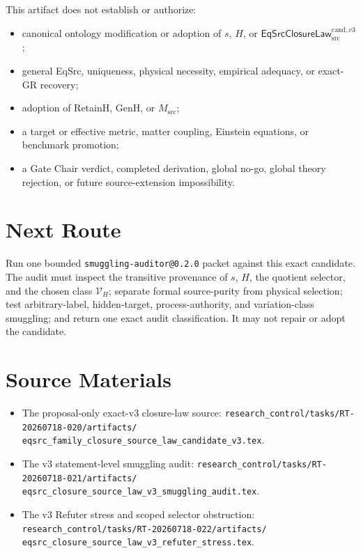 \documentclass[11pt]{article}
\newcommand{\Law}{\mathsf{EqSrcClosureLaw}^{\mathrm{cand},v3}_{\mathrm{src}}}
\newcommand{\Vary}{\mathcal V_H}
\begin{document}
This artifact does not establish or authorize:
\begin{itemize}[leftmargin=*]
  \item canonical ontology modification or adoption of \(s\), \(H\), or
  \(\Law\);
  \item general EqSrc, uniqueness, physical necessity, empirical adequacy, or
  exact-GR recovery;
  \item adoption of RetainH, GenH, or \(M_{\mathrm{src}}\);
  \item a target or effective metric, matter coupling, Einstein equations, or
  benchmark promotion;
  \item a Gate Chair verdict, completed derivation, global no-go, global
  theory rejection, or future source-extension impossibility.
\end{itemize}

\section{Next Route}

Run one bounded \texttt{smuggling-auditor@0.2.0} packet against this exact
candidate. The audit must inspect the transitive provenance of \(s\), \(H\),
the quotient selector, and the chosen class \(\Vary\); separate formal
source-purity from physical selection; test arbitrary-label, hidden-target,
process-authority, and variation-class smuggling; and return one exact audit
classification. It may not repair or adopt the candidate.

\section{Source Materials}

\begin{itemize}[leftmargin=*]
  \item The proposal-only exact-v3 closure-law source:
  \texttt{research\_control/tasks/RT-20260718-020/artifacts/}
  \texttt{eqsrc\_family\_closure\_source\_law\_candidate\_v3.tex}.
  \item The v3 statement-level smuggling audit:
  \texttt{research\_control/tasks/RT-20260718-021/artifacts/}
  \texttt{eqsrc\_closure\_source\_law\_v3\_smuggling\_audit.tex}.
  \item The v3 Refuter stress and scoped selector obstruction:
  \texttt{research\_control/tasks/RT-20260718-022/artifacts/}
  \texttt{eqsrc\_closure\_source\_law\_v3\_refuter\_stress.tex}.
\end{itemize}
\end{document}
